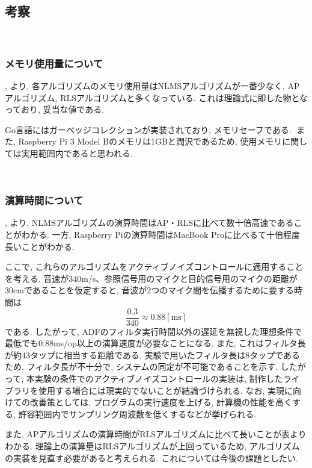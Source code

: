 \subsection{考察}\label{consideration-color}

\
\subsubsection{メモリ使用量について}\label{about-memory}

, より, 各アルゴリズムのメモリ使用量はNLMSアルゴリズムが一番少なく, APアルゴリズム, RLSアルゴリズムと多くなっている. これは理論式に即した物となっており, 妥当な値である. 

Go言語にはガーベッジコレクションが実装されており, メモリセーフである. また, Raspberry
Pi 3 Model
Bのメモリは1GBと潤沢であるため, 使用メモリに関しては実用範囲内であると思われる. 

\
\subsubsection{演算時間について}\label{about-time}

, より, NLMSアルゴリズムの演算時間はAP・RLSに比べて数十倍高速であることがわかる. 一方, Raspberry Piの演算時間はMacBook Proに比べるて十倍程度長いことがわかる. 

ここで, これらのアルゴリズムをアクティブノイズコントロールに適用することを考える. 
音速が340m/s、参照信号用のマイクと目的信号用のマイクの距離が30cmであることを仮定すると, 音波が2つのマイク間を伝播するために要する時間は
\begin{equation}
  \frac{0.3}{340} \approx 0.88 [\si{\milli \second}]
\end{equation}
である. したがって, ADFのフィルタ実行時間以外の遅延を無視した理想条件で最低でも0.88ms/op以上の演算速度が必要なことになる. 
また, これはフィルタ長が約43タップに相当する距離である. 実験で用いたフィルタ長は8タップであるため, フィルタ長が不十分で, システムの同定が不可能であることを示す. 
したがって, 本実験の条件でのアクティブノイズコントロールの実装は, 制作したライブラリを使用する場合には現実的でないことが結論づけられる. 
なお, 実現に向けての改善策としては, プログラムの実行速度を上げる, 計算機の性能を高くする, 許容範囲内でサンプリング周波数を低くするなどが挙げられる. 


また, APアルゴリズムの演算時間がRLSアルゴリズムに比べて長いことが表よりわかる. 理論上の演算量はRLSアルゴリズムが上回っているため, アルゴリズムの実装を見直す必要があると考えられる. これについては今後の課題としたい. 

